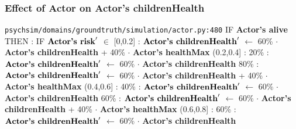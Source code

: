 \documentclass{article}%
\begin{document}
\subsubsection{Effect of Actor on Actor's childrenHealth}%
\label{ssubsec:Effect of Actor on Actor's childrenHealth}%
\begin{flushleft}%
\verb|psychsim/domains/groundtruth/simulation/actor.py:480|%
\linebreak%
IF %
\textbf{Actor's alive}%
\linebreak%
\hspace*{2em}%
THEN %
: %
IF %
$\mbox{\textbf{Actor's risk}} '$%
$\in$%
\linebreak%
\hspace*{4em}%
{[}0,0.2{]}%
: %
$\mbox{\textbf{Actor's childrenHealth}} '$%
$\leftarrow$%
60\%%
$\cdot$%
\textbf{Actor's childrenHealth}%
+%
40\%%
$\cdot$%
\textbf{Actor's healthMax}%
\linebreak%
\hspace*{4em}%
(0.2,0.4{]}%
: %
\linebreak%
\hspace*{6em}%
20\%%
: %
$\mbox{\textbf{Actor's childrenHealth}} '$%
$\leftarrow$%
60\%%
$\cdot$%
\textbf{Actor's childrenHealth}%
\linebreak%
\hspace*{6em}%
80\%%
: %
$\mbox{\textbf{Actor's childrenHealth}} '$%
$\leftarrow$%
60\%%
$\cdot$%
\textbf{Actor's childrenHealth}%
+%
40\%%
$\cdot$%
\textbf{Actor's healthMax}%
\linebreak%
\hspace*{4em}%
(0.4,0.6{]}%
: %
\linebreak%
\hspace*{6em}%
40\%%
: %
$\mbox{\textbf{Actor's childrenHealth}} '$%
$\leftarrow$%
60\%%
$\cdot$%
\textbf{Actor's childrenHealth}%
\linebreak%
\hspace*{6em}%
60\%%
: %
$\mbox{\textbf{Actor's childrenHealth}} '$%
$\leftarrow$%
60\%%
$\cdot$%
\textbf{Actor's childrenHealth}%
+%
40\%%
$\cdot$%
\textbf{Actor's healthMax}%
\linebreak%
\hspace*{4em}%
(0.6,0.8{]}%
: %
\linebreak%
\hspace*{6em}%
60\%%
: %
$\mbox{\textbf{Actor's childrenHealth}} '$%
$\leftarrow$%
60\%%
$\cdot$%
\textbf{Actor's childrenHealth}%
\linebreak%
\hspace*{6em}%

\end{flushleft}
\end{document}
